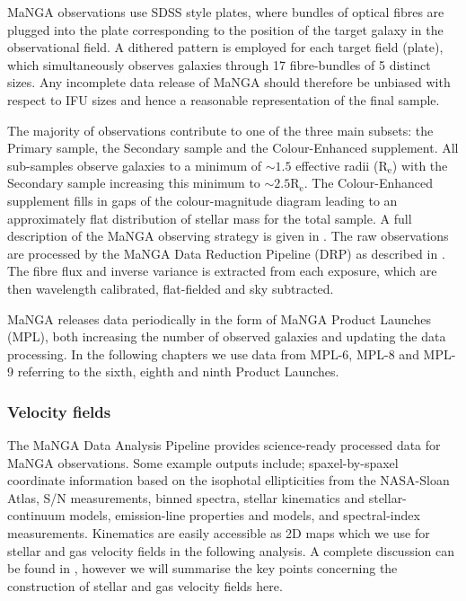 MaNGA observations use SDSS style plates, where bundles of optical fibres are plugged into the plate corresponding to the position of the target galaxy in the observational field. A dithered pattern is employed for each target field (plate), which simultaneously observes galaxies through 17 fibre-bundles of 5 distinct sizes. Any incomplete data release of MaNGA should therefore be unbiased with respect to IFU sizes and hence a reasonable representation of the final sample.

The majority of observations contribute to one of the three main subsets: the Primary sample, the Secondary sample and the Colour-Enhanced supplement. All sub-samples observe galaxies to a minimum of $\sim 1.5$ effective radii ($\mathrm{R_{e}}$) with the Secondary sample increasing this minimum to $\sim 2.5 \mathrm{R_{e}}$. The Colour-Enhanced supplement fills in gaps of the colour-magnitude diagram leading to an approximately flat distribution of stellar mass for the total sample. A full description of the MaNGA observing strategy is given in \citet{law2015obs,yan2016obs}. The raw observations are processed by the MaNGA Data Reduction Pipeline (DRP) as described in \citet{law2016drp, yan2016spec}. The fibre flux and inverse variance is extracted from each exposure, which are then wavelength calibrated, flat-fielded and sky subtracted.

MaNGA releases data periodically in the form of MaNGA Product Launches (MPL), both increasing the number of observed galaxies and updating the data processing. In the following chapters we use data from MPL-6, MPL-8 and MPL-9 referring to the sixth, eighth and ninth Product Launches.
 
\subsubsection{Velocity fields} \label{sec:vel_fields_intro}
The MaNGA Data Analysis Pipeline \citep[DAP][]{westfall2019,belfiore2019} provides science-ready processed data for MaNGA observations. Some example outputs include; spaxel-by-spaxel coordinate information based on the isophotal ellipticities from the NASA-Sloan Atlas, S/N measurements, binned spectra, stellar kinematics and stellar-continuum models, emission-line properties and models, and spectral-index measurements. Kinematics are easily accessible as 2D maps which we use for stellar and gas velocity fields in the following analysis. A complete discussion can be found in \citet{westfall2019,belfiore2019}, however we will summarise the key points concerning the construction of stellar and gas velocity fields here.

